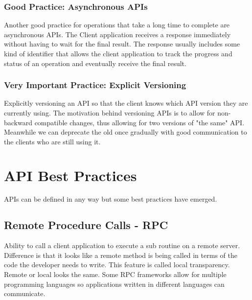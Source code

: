 \documentclass[a4paper, 11pt]{book}
\begin{document}
    \subsubsection{Good Practice: Asynchronous APIs}
    Another good practice for operations that take a long time to complete are asynchronous APIs.
    The Client application receives a response immediately without having to wait for the final result.
    The response usually includes some kind of identifier that allows the client application to track the progress
    and status of an operation and eventually receive the final result.

    \subsubsection{Very Important Practice: Explicit Versioning}
    Explicitly versioning an API so that the client knows which API version they are currently using.
    The motivation behind versioning APIs is to allow for non-backward compatible changes, thus allowing for two versions of "the same" API\@.
    Meanwhile we can deprecate the old once gradually with good communication to the clients who are still using it.

    \section{API Best Practices}
    APIs can be defined in any way but some best practices have emerged.

    \subsection{Remote Procedure Calls - RPC}
    Ability to call a client application to execute a sub routine on a remote server.
    Difference is that it looks like a remote method is being called in terms of the code the developer needs to write.
    This feature is called local transparency.
    Remote or local looks the same.
    Some RPC frameworks allow for multiple programming languages so applications written in different languages can communicate.
\end{document}
